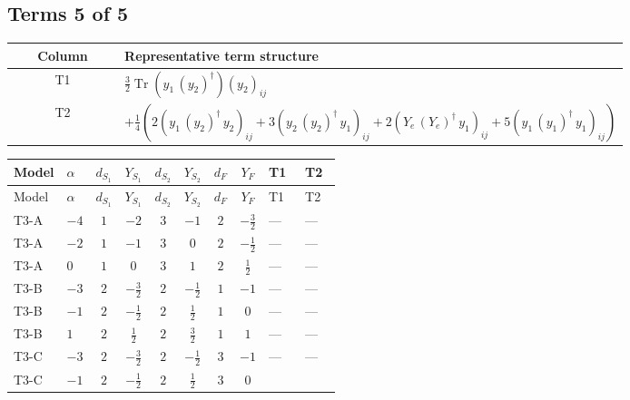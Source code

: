 \documentclass[8pt]{article}
\begin{document}
\begin{landscape}
\subsection*{Terms 5 of 5}
\begin{center}
\begin{tabular}{@{}c >{\raggedright\arraybackslash}p{0.82\linewidth}@{}}
\toprule
Column & Representative term structure \\
\midrule
T1 & \(\displaystyle \frac{3}{2} \operatorname{Tr}\!\left({y_1}\,\left({y_2}\right)^{\dagger}\right) \left({y_2}\right)_{ij}\) \\
\midrule
T2 & \(\displaystyle +\frac{1}{4} (2 \left({y_1}\,\left({y_2}\right)^{\dagger}\,{y_2}\right)_{ij}+3 \left({y_2}\,\left({y_2}\right)^{\dagger}\,{y_1}\right)_{ij}+2 \left({Y_e}\,\left({Y_e}\right)^{\dagger}\,{y_1}\right)_{ij}+5 \left({y_1}\,\left({y_1}\right)^{\dagger}\,{y_1}\right)_{ij})\) \\
\midrule
\bottomrule
\end{tabular}
\end{center}
\smallskip
\tiny
\begin{longtable}{@{}llcccccc >{\raggedright\arraybackslash}p{0.21\linewidth} >{\raggedright\arraybackslash}p{0.21\linewidth}@{}}
\toprule
Model & $\alpha$ & $d_{S_1}$ & $Y_{S_1}$ & $d_{S_2}$ & $Y_{S_2}$ & $d_F$ & $Y_F$ & T1 & T2 \\
\midrule
\endfirsthead
\toprule
Model & $\alpha$ & $d_{S_1}$ & $Y_{S_1}$ & $d_{S_2}$ & $Y_{S_2}$ & $d_F$ & $Y_F$ & T1 & T2 \\
\midrule
\endhead
T3-A & $-4$ & $1$ & $-2$ & $3$ & $-1$ & $2$ & $-\frac{3}{2}$ & --- & --- \\
\midrule
T3-A & $-2$ & $1$ & $-1$ & $3$ & $0$ & $2$ & $-\frac{1}{2}$ & --- & --- \\
\midrule
T3-A & $0$ & $1$ & $0$ & $3$ & $1$ & $2$ & $\frac{1}{2}$ & --- & --- \\
\midrule
T3-B & $-3$ & $2$ & $-\frac{3}{2}$ & $2$ & $-\frac{1}{2}$ & $1$ & $-1$ & --- & --- \\
\midrule
T3-B & $-1$ & $2$ & $-\frac{1}{2}$ & $2$ & $\frac{1}{2}$ & $1$ & $0$ & --- & --- \\
\midrule
T3-B & $1$ & $2$ & $\frac{1}{2}$ & $2$ & $\frac{3}{2}$ & $1$ & $1$ & --- & --- \\
\midrule
T3-C & $-3$ & $2$ & $-\frac{3}{2}$ & $2$ & $-\frac{1}{2}$ & $3$ & $-1$ & --- & --- \\
\midrule
T3-C & $-1$ & $2$ & $-\frac{1}{2}$ & $2$ & $\frac{1}{2}$ & $3$ & $0$ & \scriptsize\adjustbox{max width=\linewidth}{$\begin{gathered} \frac{3}{2} \operatorname{Tr}\!\left({y_1}\,\left({y_2}\right)^{\dagger}\right) \left({y_2}\right)_{ij}\end{gathered}$} & \scriptsize\adjustbox{max width=\linewidth}{$\begin{gathered} +\frac{1}{4} (2 \left({y_1}\,\left({y_2}\right)^{\dagger}\,{y_2}\right)_{ij}+3 \left({y_2}\,\left({y_2}\right)^{\dagger}\,{y_1}\right)_{ij}+2 \left({Y_e}\,\left({Y_e}\right)^{\dagger}\,{y_1}\right)_{ij}+5 \left({y_1}\,\left({y_1}\right)^{\dagger}\,{y_1}\right)_{ij})\end{gathered}$} \\

\end{longtable}
\end{landscape}
\end{document}
